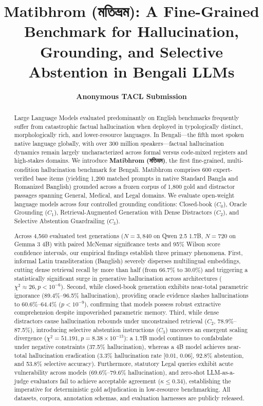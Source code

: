 \documentclass[11pt,a4paper,twocolumn]{article}
\title{\textbf{Matibhrom (\foreignlanguage{bengali}{মতিভ্রম}): A Fine-Grained Benchmark for Hallucination, Grounding, and Selective Abstention in Bengali LLMs}}
\author{\textbf{Anonymous TACL Submission}}
\date{}
\DeclareRobustCommand{\foreignlanguage}[2]{#2}
\let\bengalifont\relax
\DeclareRobustCommand{\foreignlanguage}[2]{{\bengalifont #2}}
\DeclareRobustCommand{\foreignlanguage}[2]{#2}
\begin{document}
\maketitle

\begin{abstract}
Large Language Models evaluated predominantly on English benchmarks frequently suffer from catastrophic factual hallucination when deployed in typologically distinct, morphologically rich, and lower-resource languages. In Bengali---the fifth most spoken native language globally, with over 300 million speakers---factual hallucination dynamics remain largely uncharacterized across formal versus code-mixed registers and high-stakes domains. We introduce \textbf{Matibhrom (\foreignlanguage{bengali}{মতিভ্রম})}, the first fine-grained, multi-condition hallucination benchmark for Bengali. Matibhrom comprises 600 expert-verified base items (yielding 1,200 matched prompts in native Standard Bangla and Romanized Banglish) grounded across a frozen corpus of 1,800 gold and distractor passages spanning General, Medical, and Legal domains. We evaluate open-weight language models across four controlled grounding conditions: Closed-book ($C_0$), Oracle Grounding ($C_1$), Retrieval-Augmented Generation with Dense Distractors ($C_2$), and Selective Abstention Guardrailing ($C_3$). 

Across 4,560 evaluated test generations ($N=3,840$ on Qwen 2.5 1.7B, $N=720$ on Gemma 3 4B) with paired McNemar significance tests and 95\% Wilson score confidence intervals, our empirical findings establish three primary phenomena. First, informal Latin transliteration (Banglish) severely disperses multilingual embeddings, cutting dense retrieval recall by more than half (from 66.7\% to 30.0\%) and triggering a statistically significant surge in generative hallucination across architectures ($\chi^2 \approx 26, p < 10^{-6}$). Second, while closed-book generation exhibits near-total parametric ignorance (89.4\%--96.5\% hallucination), providing oracle evidence slashes hallucinations to 60.6\%--64.4\% ($p < 10^{-9}$), confirming that models possess robust extractive comprehension despite impoverished parametric memory. Third, while dense distractors cause hallucination rebounds under unconstrained retrieval ($C_2$, 78.9\%--87.5\%), introducing selective abstention instructions ($C_3$) uncovers an emergent scaling divergence ($\chi^2 = 51.191, p = 8.38 \times 10^{-13}$): a 1.7B model continues to confabulate under negative constraints (37.5\% hallucination), whereas a 4B model achieves near-total hallucination eradication (3.3\% hallucination rate [0.01, 0.06], 92.8\% abstention, and 53.8\% selective accuracy). Furthermore, statutory Legal queries exhibit acute vulnerability across models (69.6\%--79.6\% hallucination), and zero-shot LLM-as-a-judge evaluators fail to achieve acceptable agreement ($\kappa \le 0.34$), establishing the imperative for deterministic gold adjudication in low-resource benchmarking. All datasets, corpora, annotation schemas, and evaluation harnesses are publicly released.
\end{abstract}
\end{document}
